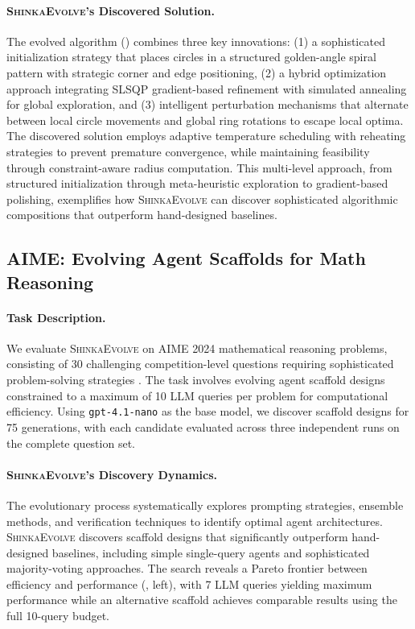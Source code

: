 \documentclass[11pt, a4paper]{include/gdm_format}
\newcommand{\ouralgo}{\textsc{ShinkaEvolve}\xspace}
\begin{document}
\paragraph{\ouralgo's Discovered Solution.} The evolved algorithm () combines three key innovations: (1) a sophisticated initialization strategy that places circles in a structured golden-angle spiral pattern with strategic corner and edge positioning, (2) a hybrid optimization approach integrating SLSQP gradient-based refinement with simulated annealing for global exploration, and (3) intelligent perturbation mechanisms that alternate between local circle movements and global ring rotations to escape local optima. The discovered solution employs adaptive temperature scheduling with reheating strategies to prevent premature convergence, while maintaining feasibility through constraint-aware radius computation. This multi-level approach, from structured initialization through meta-heuristic exploration to gradient-based polishing, exemplifies how \ouralgo can discover sophisticated algorithmic compositions that outperform hand-designed baselines.


\newpage
\subsection{AIME: Evolving Agent Scaffolds for Math Reasoning}


\paragraph{Task Description.}
We evaluate \ouralgo on AIME 2024 \citep{AIME2024} mathematical reasoning problems, consisting of 30 challenging competition-level questions requiring sophisticated problem-solving strategies \citep{hu2024automated}.
The task involves evolving agent scaffold designs constrained to a maximum of 10 LLM queries per problem for computational efficiency.
Using \texttt{gpt-4.1-nano} as the base model, we discover scaffold designs for 75 generations, with each candidate evaluated across three independent runs on the complete question set.

\paragraph{\ouralgo's Discovery Dynamics.}
The evolutionary process systematically explores prompting strategies, ensemble methods, and verification techniques to identify optimal agent architectures.
\ouralgo discovers scaffold designs that significantly outperform hand-designed baselines, including simple single-query agents and sophisticated majority-voting approaches.
The search reveals a Pareto frontier between efficiency and performance (, left), with 7 LLM queries yielding maximum performance while an alternative scaffold achieves comparable results using the full 10-query budget.
\end{document}
